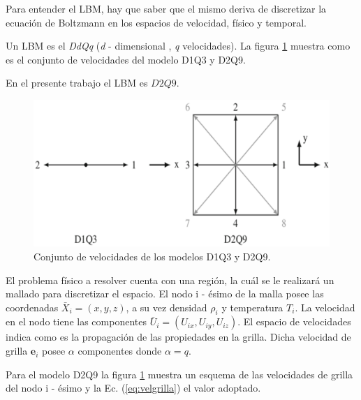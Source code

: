 Para entender el LBM, hay que saber que el mismo deriva de discretizar la ecuación de Boltzmann en los espacios de velocidad, físico y temporal.  


Un LBM es el \textit{DdQq} (\textit{d} - dimensional , \textit{q} velocidades). La figura \ref{fig:D1Q3_D2Q9} muestra como es el conjunto de velocidades del modelo D1Q3 y D2Q9.

En el presente trabajo el LBM es $D2Q9$. 

\begin{figure}[h]
	\centering
    \includegraphics[width=.8\textwidth]{figs/cap3/D1Q3_D2Q9}
	\caption{Conjunto de velocidades de los modelos D1Q3 y D2Q9. \cite{kruger2017lattice}}
	\label{fig:D1Q3_D2Q9}	
\end{figure}

El problema físico a resolver cuenta con una región, la cuál se le realizará un mallado para discretizar el espacio. El nodo i - ésimo de la malla posee las coordenadas ${\bar{X}}_{i} = (x,y,z)$, a su vez densidad $\rho_{i}$ y temperatura $T_{i}$. La velocidad en el nodo tiene las componentes ${\bar{U}}_{i} = ({U}_{ix},{U}_{iy},{U}_{iz})$. El espacio de velocidades indica como es la propagación de las propiedades en la grilla. Dicha velocidad de grilla $\mathbf{e}_{i}$ posee $\alpha$ componentes donde $\alpha = q $. 

Para el modelo D2Q9 la figura \ref{fig:D1Q3_D2Q9} muestra un esquema de las velocidades de grilla del nodo i - ésimo y la Ec. (\ref{eq:velgrilla}) el valor adoptado.


